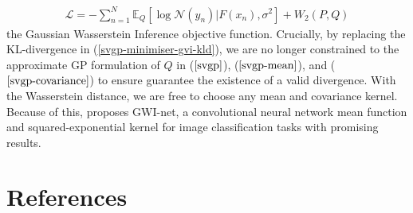\documentclass[twoside,11pt]{article}
\begin{document}
\begin{align}
    \label{gwi-objective}
    \mathcal{L} = -\sum_{n=1}^N \mathbb{E}_{Q}\left[\log \mathcal{N}(y_n) \vert F(x_n), \sigma^2\right] + W_2 (P, Q)
\end{align}
the Gaussian Wasserstein Inference objective function. Crucially, by replacing the KL-divergence in (\ref{svgp-minimiser-gvi-kld}), we are no longer constrained to the approximate GP formulation of $Q$ in ($\ref{svgp}$),  ($\ref{svgp-mean}$), and ($\ref{svgp-covariance}$) to ensure guarantee the existence of a valid divergence. With the Wasserstein distance, we are free to choose any mean and covariance kernel. Because of this, \cite{wild2022generalized} proposes GWI-net, a convolutional neural network mean function and squared-exponential kernel for image classification tasks with promising results.
\begingroup
\let\clearpage\relax
\AtNextBibliography{\small}
\section*{References}
\printbibliography[heading=talikarng, title = {References}]
\endgroup
\end{document}
